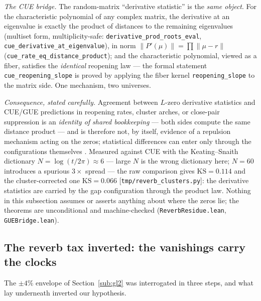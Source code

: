 \documentclass[11pt]{article}
\newcommand{\code}[1]{\texttt{#1}}
\begin{document}
\emph{The CUE bridge.}  The random-matrix ``derivative statistic'' is the \emph{same object}.  For
the characteristic polynomial of any complex matrix, the derivative at an eigenvalue is exactly the
product of distances to the remaining eigenvalues (multiset form, multiplicity-safe:
\code{derivative\_prod\_roots\_eval}, \code{cue\_derivative\_at\_eigenvalue}), in norm
$\|P'(\mu)\|=\prod\|\mu-r\|$ (\code{cue\_rate\_eq\_distance\_product}); and the characteristic
polynomial, viewed as a fiber, satisfies the \emph{identical} reopening law --- the formal statement
\code{cue\_reopening\_slope} is proved by applying the fiber kernel \code{reopening\_slope} to the
matrix side.  One mechanism, two universes.

\emph{Consequence, stated carefully.}  Agreement between $L$-zero derivative statistics and
CUE/GUE predictions in reopening rates, cluster arches, or close-pair suppression is an
\emph{identity of shared bookkeeping} --- both sides compute the same distance product --- and is
therefore not, by itself, evidence of a repulsion mechanism acting on the zeros; statistical
differences can enter only through the configurations themselves \cite{Montgomery1973}.  Measured
against CUE with the Keating--Snaith dictionary $N=\log(t/2\pi)\approx6$ --- large $N$ is the wrong
dictionary here; $N=60$ introduces a spurious $3\times$ spread --- the raw comparison gives
$\mathrm{KS}=0.114$ and the cluster-corrected one $\mathrm{KS}=0.066$
[\code{tmp/reverb\_clusters.py}]: the derivative statistics are carried by the gap configuration
through the product law.  Nothing in
this subsection assumes or asserts anything about where the zeros lie; the theorems are
unconditional and machine-checked (\code{ReverbResidue.lean}, \code{GUEBridge.lean}).

\subsection{The reverb tax inverted: the vanishings carry the clocks}\label{sub:clockdip}

The $\pm4\%$ envelope of Section~\ref{sub:gl2} was interrogated in three steps, and what lay
underneath inverted our hypothesis.
\end{document}
